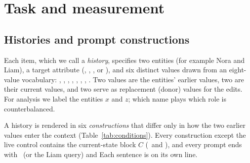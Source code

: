 \section{Task and measurement}
\label{sec:task}

\subsection{Histories and prompt constructions}
\label{sec:conditions}

Each item, which we call a \emph{history}, specifies two entities (for example Nora and Liam), a target attribute (, , , or ), and six distinct values drawn from an eight-value vocabulary: , , , , , , , . Two values are the entities' earlier values, two are their current values, and two serve as replacement (donor) values for the edits. For analysis we label the entities $x$ and $z$; which name plays which role is counterbalanced.

A history is rendered in six \emph{constructions} that differ only in how the two earlier values enter the context (Table~\ref{tab:conditions}). Every construction except the live control contains the current-state block $C$ (\ and ), and every prompt ends with \ (or the Liam query) and  Each sentence is on its own line.

